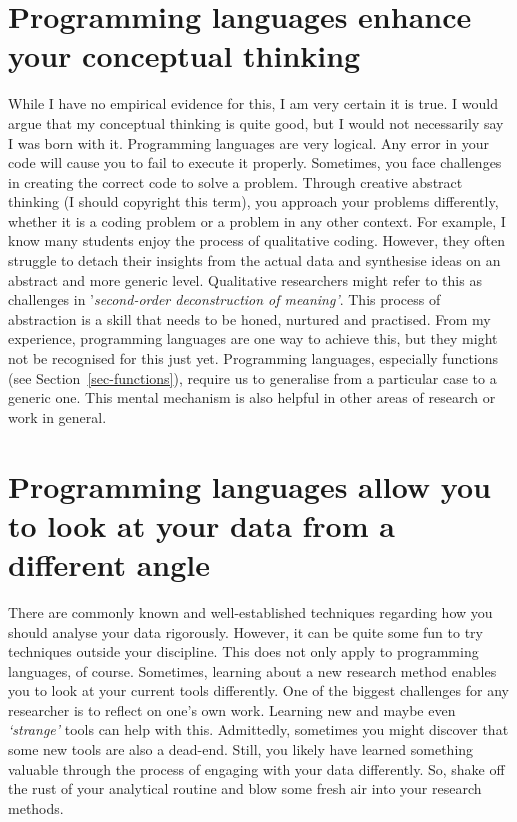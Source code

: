 \documentclass[
  letterpaper,
  DIV=11,
  numbers=noendperiod]{scrreprt}
\begin{document}
\section{Programming languages enhance your conceptual
thinking}\label{sec-programming-languages-enhance-your-conceptual-thinking}

While I have no empirical evidence for this, I am very certain it is
true. I would argue that my conceptual thinking is quite good, but I
would not necessarily say I was born with it. Programming languages are
very logical. Any error in your code will cause you to fail to execute
it properly. Sometimes, you face challenges in creating the correct code
to solve a problem. Through creative abstract thinking (I should
copyright this term), you approach your problems differently, whether it
is a coding problem or a problem in any other context. For example, I
know many students enjoy the process of qualitative coding. However,
they often struggle to detach their insights from the actual data and
synthesise ideas on an abstract and more generic level. Qualitative
researchers might refer to this as challenges in '\emph{second-order
deconstruction of meaning'}. This process of abstraction is a skill that
needs to be honed, nurtured and practised. From my experience,
programming languages are one way to achieve this, but they might not be
recognised for this just yet. Programming languages, especially
functions (see Section~\ref{sec-functions}), require us to generalise
from a particular case to a generic one. This mental mechanism is also
helpful in other areas of research or work in general.

\section{Programming languages allow you to look at your data from a
different
angle}\label{sec-programming-languages-allow-you-to-look-at-your-data-from-a-different-angle}

There are commonly known and well-established techniques regarding how
you should analyse your data rigorously. However, it can be quite some
fun to try techniques outside your discipline. This does not only apply
to programming languages, of course. Sometimes, learning about a new
research method enables you to look at your current tools differently.
One of the biggest challenges for any researcher is to reflect on one's
own work. Learning new and maybe even \emph{`strange'} tools can help
with this. Admittedly, sometimes you might discover that some new tools
are also a dead-end. Still, you likely have learned something valuable
through the process of engaging with your data differently. So, shake
off the rust of your analytical routine and blow some fresh air into
your research methods.
\end{document}
